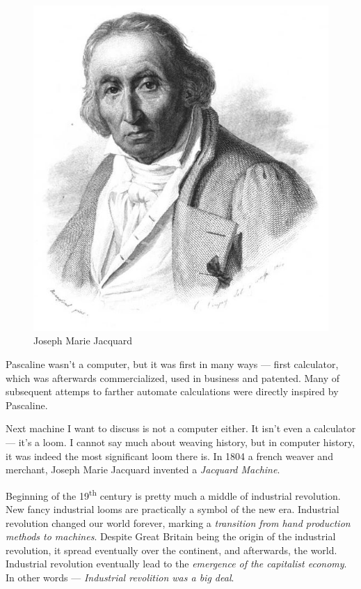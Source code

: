 \documentclass{article}
\begin{document}
            \begin{figure}
                \centering
                \includegraphics[scale=0.2]{images/persons/person_joseph_jacquard.jpg}
                \caption{Joseph Marie Jacquard}
            \end{figure}

            Pascaline wasn't a computer, but it was first in many ways --- first calculator, which was afterwards commercialized, used in business and patented. Many of 
            subsequent attemps to farther automate calculations were directly inspired by Pascaline. \par

            Next machine I want to discuss is not a computer either. It isn't even a calculator --- it's a loom. I cannot say much about weaving history, 
            but in computer history, it was indeed the most significant loom there is. In 1804 a french weaver and merchant, Joseph Marie Jacquard invented a \emph{Jacquard Machine}.

            Beginning of the 19\textsuperscript{th} century is pretty much a middle of industrial revolution. New fancy industrial looms are practically a 
            symbol of the new era. Industrial revolution changed our world forever, marking a \emph{transition from hand production methods to machines}.
            Despite Great Britain being the origin of the industrial revolution, it spread eventually over the continent, and afterwards, the world. 
            Industrial revolution eventually lead to the \emph{emergence of the capitalist economy}. In other words --- \emph{Industrial revolition was a big deal}. \par
\end{document}

